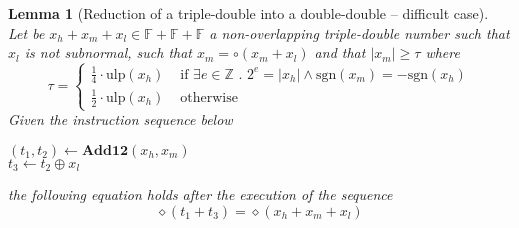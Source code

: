 \documentclass[a4paper,10pt,twoside]{article}
\newtheorem{lemma}[theorem]{Lemma}
\newcommand{\Z}{\ensuremath{\mathbb {Z}}}
\newcommand{\F}{\ensuremath{\mathbb {F}}}
\newcommand{\hi}{\ensuremath{\mathit{h}}}
\newcommand{\mi}{\ensuremath{\mathit{m}}}
\newcommand{\lo}{\ensuremath{\mathit{l}}}
\newcommand{\mAdd}{\ensuremath{\mathbf{Add12}}}
\newcommand{\mUlp}{\ensuremath{\mathrm{ulp}}}
\newcommand{\sgn}{\ensuremath{\mathrm{sgn}}}
\begin{document}
\begin{lemma}[Reduction of a triple-double into a double-double -- difficult case] \label{plusdunmiulp} ~ \\
Let be $x_\hi + x_\mi + x_\lo \in \F + \F + \F$ a non-overlapping triple-double number such that $x_\lo$ is not subnormal, such that
$x_\mi = \circ \left( x_\mi + x_\lo \right)$ and that $\left \vert x_\mi \right \vert \geq \tau$ where
$$\tau = \left \lbrace \begin{array}{ll}
\frac{1}{4} \cdot \mUlp\left( x_\hi \right) & \mbox{ if } \exists e \in \Z \mbox{ . } 2^e = \left \vert x_\hi \right \vert \land
\sgn\left( x_\mi \right) = -\sgn\left( x_\hi \right)\\
\frac{1}{2} \cdot \mUlp\left( x_\hi \right) & \mbox{ otherwise} \end{array} \right.$$
Given the instruction sequence below
\begin{center}
\begin{minipage}[b]{50mm}
$\left( t_1, t_2 \right) \gets \mAdd\left( x_\hi, x_\mi \right)$ \\
$t_3 \gets t_2 \oplus x_\lo$
\end{minipage}
\end{center}
the following equation holds after the execution of the sequence
$$\diamond\left( t_1 + t_3 \right) = \diamond\left( x_\hi + x_\mi + x_\lo \right)$$
\end{lemma}
\end{document}
